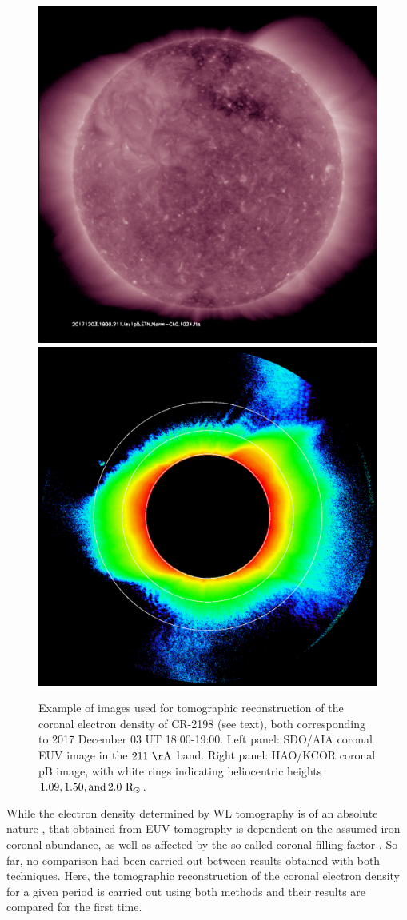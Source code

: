 \documentclass[baaa]{baaa}
\begin{document}
\begin{figure}[h]
  \centering
  \includegraphics[width=0.7\columnwidth]{img_211.pdf}
  \hskip 1cm
  \includegraphics[width=0.7\columnwidth]{20171203_180316_kcor_l1_10min_avg_image.pdf}
  \caption{Example of images used for tomographic reconstruction of the coronal electron density of CR-2198 (see text), both corresponding to 2017 December 03 UT 18:00-19:00. Left panel: SDO/AIA coronal EUV image in the $211~\rm{\AA}$ band. Right panel: HAO/KCOR coronal pB image, with white rings indicating heliocentric heights $1.09, 1.50, \rm{and}\, 2.0~\rm{R}_\odot$.}
  \label{fig_images}
\end{figure}

While the electron density determined by WL tomography is of an absolute nature \citep{frazin_2012}, that obtained from EUV tomography is dependent on the assumed iron coronal abundance, as well as affected by the so-called coronal filling factor \citep{frazin_2009}. So far, no comparison had been carried out between results obtained with both techniques. Here, the tomographic reconstruction of the coronal electron density for a given period is carried out using both methods and their results are compared for the first time.
\end{document}

